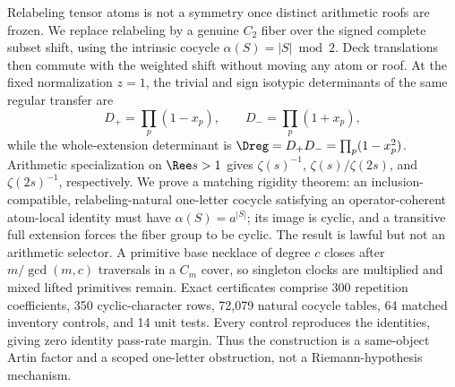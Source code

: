 Relabeling tensor atoms is not a symmetry once distinct arithmetic roofs are
frozen.  We replace relabeling by a genuine \(C_2\) fiber over the signed
complete subset shift, using the intrinsic cocycle
\(\alpha(S)=|S|\bmod2\).  Deck translations then commute with the weighted
shift without moving any atom or roof.  At the fixed normalization \(z=1\),
the trivial and sign isotypic determinants of the same regular transfer are
\[
D_+=\prod_p(1-x_p),\qquad D_-=\prod_p(1+x_p),
\]
while the whole-extension determinant is
\(\Dreg=D_+D_-=\prod_p(1-x_p^2)\).  Arithmetic specialization on
\(\Ree s>1\) gives \(\zeta(s)^{-1}\), \(\zeta(s)/\zeta(2s)\), and
\(\zeta(2s)^{-1}\), respectively.  We prove a matching rigidity theorem:
an inclusion-compatible, relabeling-natural one-letter cocycle satisfying an
operator-coherent atom-local identity must have
\(\alpha(S)=a^{|S|}\); its image is cyclic, and a transitive full extension
forces the fiber group to be cyclic.  The result is lawful but not an
arithmetic selector.  A primitive base necklace of degree \(c\) closes after
\(m/\gcd(m,c)\) traversals in a \(C_m\) cover, so singleton clocks are
multiplied and mixed lifted primitives remain.  Exact certificates comprise
300 repetition coefficients, 350 cyclic-character rows, 72,079 natural
cocycle tables, 64 matched inventory controls, and 14 unit tests.  Every
control reproduces the identities, giving zero identity pass-rate margin.
Thus the construction is a same-object Artin factor and a scoped one-letter
obstruction, not a Riemann-hypothesis mechanism.
